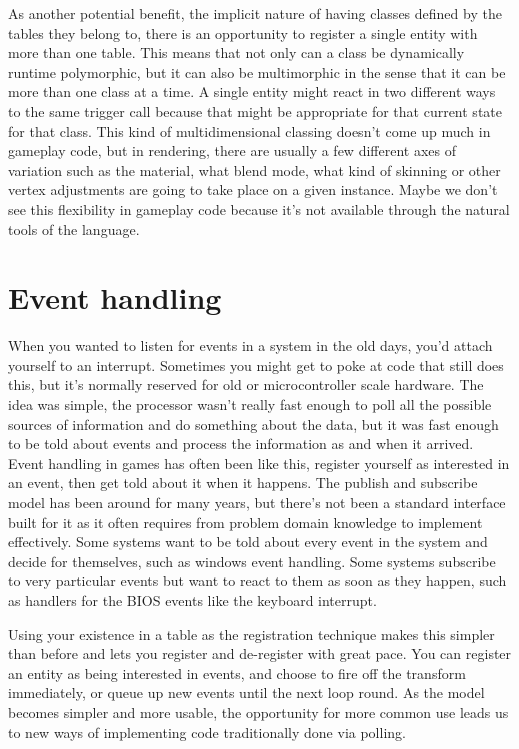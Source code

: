 As another potential benefit, the implicit nature of having classes defined by
the tables they belong to, there is an opportunity to register a single entity
with more than one table. This means that not only can a class be dynamically
runtime polymorphic, but it can also be multimorphic in the sense that it can
be more than one class at a time. A single entity might react in two different
ways to the same trigger call because that might be appropriate for that
current state for that class. This kind of multidimensional classing doesn't
come up much in gameplay code, but in rendering, there are usually a few
different axes of variation such as the material, what blend mode, what kind of
skinning or other vertex adjustments are going to take place on a given
instance. Maybe we don't see this flexibility in gameplay code because it's not
available through the natural tools of the language.

\section{Event handling}\label{sec:exist-event}

When you wanted to listen for events in a system in the old days, you'd attach
yourself to an interrupt. Sometimes you might get to poke at code that still
does this, but it's normally reserved for old or microcontroller scale
hardware. The idea was simple, the processor wasn't really fast enough to poll
all the possible sources of information and do something about the data, but it
was fast enough to be told about events and process the information as and when
it arrived. Event handling in games has often been like this, register yourself
as interested in an event, then get told about it when it happens. The publish
and subscribe model has been around for many years, but there's not been a
standard interface built for it as it often requires from problem domain
knowledge to implement effectively. Some systems want to be told about every
event in the system and decide for themselves, such as windows event handling.
Some systems subscribe to very particular events but want to react to them as
soon as they happen, such as handlers for the BIOS events like the keyboard
interrupt.

Using your existence in a table as the registration technique makes this
simpler than before and lets you register and de-register with great pace. You
can register an entity as being interested in events, and choose to fire off
the transform immediately, or queue up new events until the next loop round. As
the model becomes simpler and more usable, the opportunity for more common use
leads us to new ways of implementing code traditionally done via polling.

